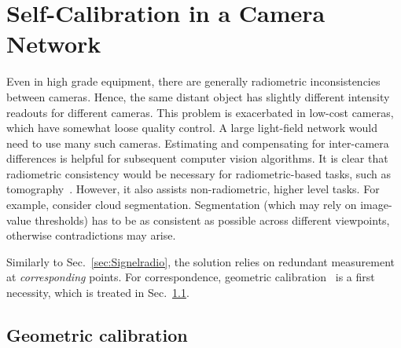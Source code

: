 \documentclass[runningheads]{llncs}
\begin{document}
\section{Self-Calibration in a Camera Network}
\label{sec:muticalib}

Even in high grade equipment, there are generally radiometric inconsistencies between cameras. Hence, the same distant object has slightly different intensity readouts for different cameras. This problem is exacerbated in low-cost cameras, which have somewhat loose quality control. A large light-field network would need to use many such cameras. Estimating and compensating for inter-camera differences is helpful for subsequent computer vision algorithms. It is clear that radiometric consistency would be necessary for radiometric-based tasks, such as tomography~\cite{Aides:13}. However, it also assists non-radiometric, higher level tasks. For example, consider cloud segmentation. Segmentation (which may rely on image-value thresholds) has to be as consistent as possible across different viewpoints, otherwise contradictions may arise. 

Similarly to Sec.~\ref{sec:Signelradio}, the solution relies on redundant measurement at {\em corresponding} points.   For correspondence, geometric calibration~\cite{Seiz2002} is a first necessity, which is treated in Sec.~\ref{sec:geometry}. 

\subsection{Geometric calibration}
\label{sec:geometry}
\end{document}
